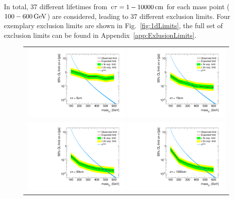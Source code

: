 In total, 37 different lifetimes from $\text{c}\tau=1-10000\,\text{cm}$ for each mass point ($100-600\,\text{Ge}\kern-0.06667em\text{V}$) are considered, leading to 37 different exclusion limits.
Four exemplary exclusion limits are shown in Fig.~\ref{fig:1dLimits}, the full set of exclusion limits can be found in Appendix~\ref{app:ExlusionLimits}.

\begin{figure}[!h]
  \centering 
  \vspace{70pt}
  \begin{tabular}{c}
    \includegraphics[width=0.49\textwidth]{figures/analysis/Interpretation/ExclusionLimits/LimitPlot_ctau5cm.pdf} 
    \includegraphics[width=0.49\textwidth]{figures/analysis/Interpretation/ExclusionLimits/LimitPlot_ctau10cm.pdf} \\
    \includegraphics[width=0.49\textwidth]{figures/analysis/Interpretation/ExclusionLimits/LimitPlot_ctau50cm.pdf} 
    \includegraphics[width=0.49\textwidth]{figures/analysis/Interpretation/ExclusionLimits/LimitPlot_ctau1000cm.pdf} 

\end{tabular}
\end{figure}

